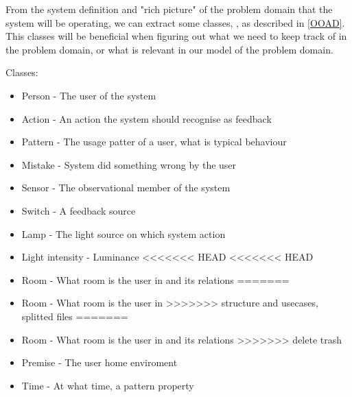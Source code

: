 From the system definition and "rich picture" of the problem domain that the system will be operating, we can extract some classes, , as described in \cref{OOAD}. This classes will be beneficial when figuring out what we need to keep track of in the problem domain, or what is relevant in our model of the problem domain.

Classes:
\begin{itemize}
\item Person - The user of the system
\item Action - An action the system should recognise as feedback
\item Pattern - The usage patter of a user, what is typical behaviour
\item Mistake - System did something wrong by the user
\item Sensor - The observational member of the system
\item Switch - A feedback source
\item Lamp - The light source on which system action
\item Light intensity - Luminance
<<<<<<< HEAD
<<<<<<< HEAD
\item Room - What room is the user in and its relations
=======
\item Room - What room is the user in
>>>>>>> structure and usecases, splitted files
=======
\item Room - What room is the user in and its relations
>>>>>>> delete trash
\item Premise - The user home enviroment
\item Time - At what time, a pattern property
\end{itemize}
